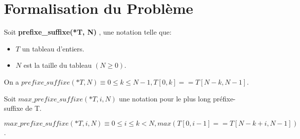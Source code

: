\section{Formalisation du Problème}\label{formalisation}

Soit \textbf{prefixe\_suffixe(*T, N)} , une notation telle que:
\begin{itemize}
   \item $T$ un tableau d'entiers.
   \item $N$ est la taille du tableau $(N \geq 0)$.
\end{itemize}

\vspace{0.2cm}
On a $prefixe\_suffixe (*T, N) \equiv 0 \leq k \leq N-1, T[0, k] == T[N-k, N-1]$.

\vspace{0.4cm}
Soit $max\_prefixe\_suffixe(*T, i , N)$ une notation pour le plus long 
préfixe-suffixe de T.

\vspace{0.2cm}
$max\_prefixe\_suffixe(*T, i , N) \equiv 0 \leq i \leq k < N, max(T[0, i-1] == T[N - k + i
, N-1])$.
